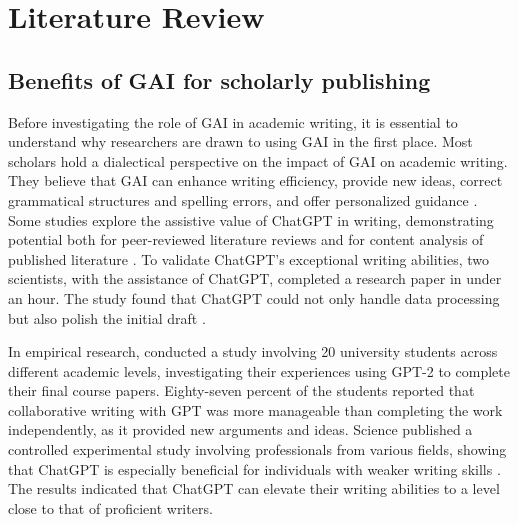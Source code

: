 \section{Literature Review}
\subsection{Benefits of GAI for scholarly publishing}
Before investigating the role of GAI in academic writing, it is essential to understand why researchers are drawn to using GAI in the first place. Most scholars hold a dialectical perspective on the impact of GAI on academic writing. They believe that GAI can enhance writing efficiency, provide new ideas, correct grammatical structures and spelling errors, and offer personalized guidance \citep{lund2023chatting,kasneci2023chat,DWIVEDI2023102642}. Some studies explore the assistive value of ChatGPT in writing, demonstrating potential both for peer-reviewed literature reviews and for content analysis of published literature \citep{dergaa2023from,rahman2023chatgpt}. To validate ChatGPT's exceptional writing abilities, two scientists, with the assistance of ChatGPT, completed a research paper in under an hour. The study found that ChatGPT could not only handle data processing but also polish the initial draft \citep{conroy2023scientists}.

In empirical research, \citet{fyfe2023how} conducted a study involving 20 university students across different academic levels, investigating their experiences using GPT-2 to complete their final course papers. Eighty-seven percent of the students reported that collaborative writing with GPT was more manageable than completing the work independently, as it provided new arguments and ideas. Science published a controlled experimental study involving professionals from various fields, showing that ChatGPT is especially beneficial for individuals with weaker writing skills \citep{noy2023experimental}. The results indicated that ChatGPT can elevate their writing abilities to a level close to that of proficient writers.

